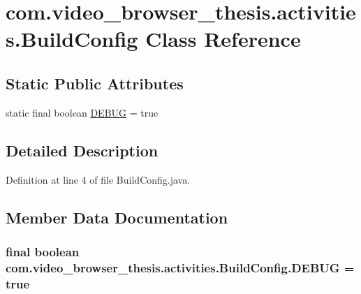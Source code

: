\hypertarget{classcom_1_1video__browser__thesis_1_1activities_1_1_build_config}{\section{com.\-video\-\_\-browser\-\_\-thesis.\-activities.\-Build\-Config Class Reference}
\label{classcom_1_1video__browser__thesis_1_1activities_1_1_build_config}
}
\subsection*{Static Public Attributes}
\begin{DoxyCompactItemize}
\item 
static final boolean \hyperlink{classcom_1_1video__browser__thesis_1_1activities_1_1_build_config_a21a4f9d8952ed9679049fca1acbdb108}{D\-E\-B\-U\-G} = true
\end{DoxyCompactItemize}


\subsection{Detailed Description}


Definition at line 4 of file Build\-Config.\-java.



\subsection{Member Data Documentation}
\hypertarget{classcom_1_1video__browser__thesis_1_1activities_1_1_build_config_a21a4f9d8952ed9679049fca1acbdb108}{
\subsubsection[{D\-E\-B\-U\-G}]{\setlength{\rightskip}{0pt plus 5cm}final boolean com.\-video\-\_\-browser\-\_\-thesis.\-activities.\-Build\-Config.\-D\-E\-B\-U\-G = true\hspace{0.3cm}{\ttfamily [static]}}}\label{classcom_1_1video__browser__thesis_1_1activities_1_1_build_config_a21a4f9d8952ed9679049fca1acbdb108}



